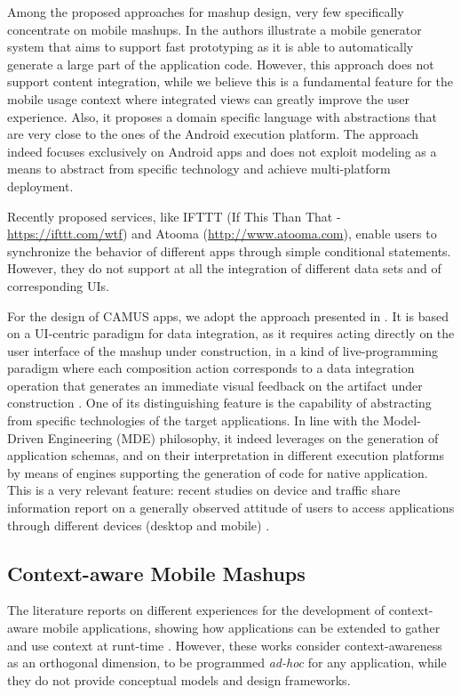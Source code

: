 Among the proposed approaches for mashup design, very few specifically concentrate on mobile mashups. In \cite{DBLP:conf/icwe/ChaisatienPT11} the authors illustrate a mobile generator system that aims to support fast prototyping as it is able to automatically generate a large part of the application code. However, this approach does not support content integration, while we believe this is a fundamental feature for the mobile usage context where integrated views can greatly improve the user experience. Also, it proposes a domain specific language with abstractions that are very close to the ones of the Android execution platform. The approach indeed focuses exclusively on Android apps and does not exploit modeling as a means to abstract from specific technology and achieve multi-platform deployment.

Recently proposed services, like IFTTT (If This Than That - \url{https://ifttt.com/wtf}) and Atooma (\url{http://www.atooma.com}),
enable users to synchronize the behavior of different apps through simple conditional
statements. However, they do not support at all the integration of different data sets
and of corresponding UIs.

For the design of CAMUS apps, we adopt the approach presented in \cite{journals/TWEB2015/CappielloMP15}. It is based on a UI-centric paradigm for data integration, as it requires acting directly on the user interface of the mashup under construction, in a kind of live-programming paradigm where each composition action corresponds to a data integration operation that generates an immediate visual feedback on the artifact under construction \cite{DBLP:conf/www/CappielloMPCG12,DBLP:conf/hci/CappielloMP13}. One of its distinguishing feature is the capability of abstracting from specific technologies of the target applications. In line with the Model-Driven Engineering (MDE) philosophy, it indeed leverages on the generation of application schemas, and on their interpretation in different execution platforms by means of engines supporting the generation of code for native application. This is a very relevant feature: recent studies on device and traffic share information report on a generally observed attitude of users to access applications through different devices (desktop and mobile) \cite{ComScore2015}.

\subsection{Context-aware Mobile Mashups}
The literature reports on different experiences for the development of context-aware mobile applications, showing how applications can be extended to gather and use context at runt-time \cite{Schaller:2014:MTG:2637002.2637052}. However, these works consider context-awareness as an orthogonal dimension, to be programmed \emph{ad-hoc} for any application, while they do not provide conceptual models and design frameworks.

